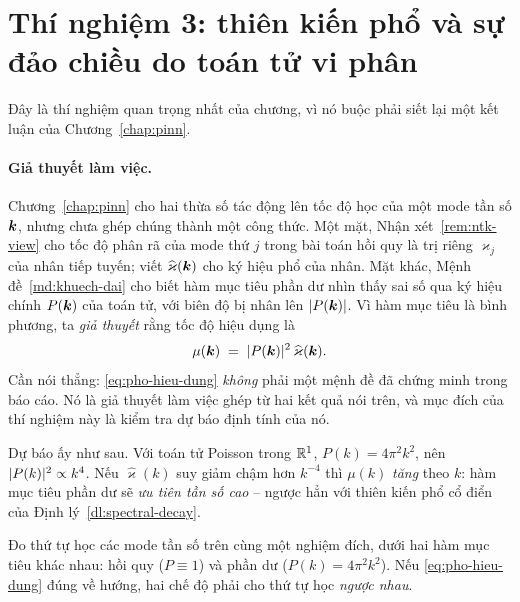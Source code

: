 \section{Thí nghiệm 3: thiên kiến phổ và sự đảo chiều do toán tử vi phân}
\label{sec:tn3}
 
Đây là thí nghiệm quan trọng nhất của chương, vì nó buộc phải siết lại một kết
luận của Chương~\ref{chap:pinn}.
 
\paragraph{Giả thuyết làm việc.}
Chương~\ref{chap:pinn} cho hai thừa số tác động lên tốc độ học của một mode tần
số $\bm{k}$, nhưng chưa ghép chúng thành một công thức. Một mặt,
Nhận xét~\ref{rem:ntk-view} cho tốc độ phân rã của mode thứ $j$ trong bài toán
hồi quy là trị riêng $\varkappa_j$ của nhân tiếp tuyến; viết
$\widehat{\varkappa}(\bm{k})$ cho ký hiệu phổ của nhân. Mặt khác,
Mệnh đề~\ref{md:khuech-dai} cho biết hàm mục tiêu phần dư nhìn thấy sai số qua ký
hiệu chính $P(\bm{k})$ của toán tử, với biên độ bị nhân lên $\lvert P(\bm{k})\rvert$. Vì hàm mục tiêu là bình phương, ta \emph{giả thuyết} rằng tốc độ hiệu dụng là
\begin{equation}
\mu(\bm{k}) \;=\; \lvert P(\bm{k})\rvert^{2}\,\widehat{\varkappa}(\bm{k}).
\label{eq:pho-hieu-dung}
\end{equation}
Cần nói thẳng: \eqref{eq:pho-hieu-dung} \emph{không} phải một mệnh đề đã chứng
minh trong báo cáo. Nó là giả thuyết làm việc ghép từ hai kết quả nói trên, và
mục đích của thí nghiệm này là kiểm tra dự báo định tính của nó.
 
Dự báo ấy như sau. Với toán tử Poisson trong $\mathbb{R}^1$, $P(k) = 4\pi^2k^2$, nên
$\lvert P(k)\rvert^{2} \propto k^{4}$. Nếu $\widehat{\varkappa}(k)$ suy giảm chậm hơn
$k^{-4}$ thì $\mu(k)$ \emph{tăng} theo $k$: hàm mục tiêu phần dư sẽ \emph{ưu tiên
tần số cao} -- ngược hẳn với thiên kiến phổ cổ điển của
Định lý~\ref{dl:spectral-decay}.
 
\begin{thinghiem}
\label{tn:pho}
Đo thứ tự học các mode tần số trên cùng một nghiệm đích, dưới hai hàm mục tiêu
khác nhau: hồi quy ($P \equiv 1$) và phần dư ($P(k) = 4\pi^2k^2$). Nếu
\eqref{eq:pho-hieu-dung} đúng về hướng, hai chế độ phải cho thứ tự học
\emph{ngược nhau}.
\end{thinghiem}
 
